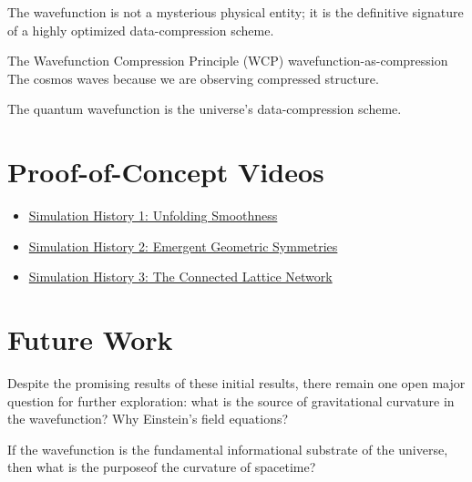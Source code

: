 The wavefunction is not a mysterious physical entity; it is the definitive signature of a highly optimized data-compression scheme.


\begin{principle}{The Wavefunction Compression Principle (WCP)}
{wavefunction-as-compression}
The cosmos waves because we are observing compressed structure.

The quantum wavefunction is the universe's data-compression scheme.
\end{principle}

\section{Proof-of-Concept Videos}

\begin{itemize}
    \item \href{https://youtube.com/shorts/sfwz_O_soS4?feature=share}{Simulation History 1: Unfolding Smoothness}
    \item \href{https://youtube.com/shorts/5XYXhmOgiW8}{Simulation History 2: Emergent Geometric Symmetries}
    \item \href{https://youtube.com/shorts/XAMWDg5zX6I}{Simulation History 3: The Connected Lattice Network}
\end{itemize}


\section{Future Work}

Despite the promising results of these initial results, there remain one open major question for further exploration:
what is the source of gravitational curvature in the wavefunction? Why Einstein's field equations? 

If the wavefunction is the fundamental informational substrate of the universe, then what is the purposeof the curvature of spacetime? 
